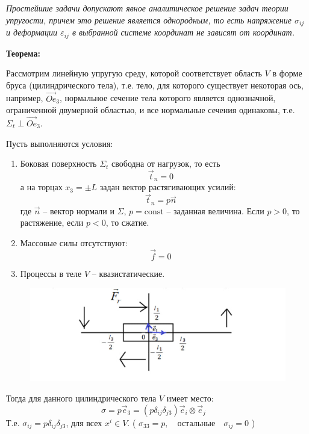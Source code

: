 

\textit{Простейшие задачи допускают явное аналитическое решение задач теории упругости, причем это решение является однородным, то есть напряжение \( \sigma_{ij} \) и деформации \( \varepsilon_{ij} \) в выбранной системе координат не зависят от координат.
}
\par
\textbf{Теорема:}

Рассмотрим линейную упругую среду, которой соответствует область \( V \) в форме бруса (цилиндрического тела), т.е. тело, для которого существует некоторая ось, например, \( \vec{Oe}_3 \), нормальное сечение тела которого является однозначной, ограниченной двумерной областью, и все нормальные сечения одинаковы, т.е. \( \Sigma_t \perp \vec{Oe}_3 \).

Пусть выполняются условия:
\begin{enumerate}
    \item Боковая поверхность \( \Sigma_t \) свободна от нагрузок, то есть
\begin{equation}
\vec{t}_n = 0 \quad \label{eq:(261)}
\end{equation}
а на торцах \( x_3 = \pm L \) задан вектор растягивающих усилий:
\begin{equation}
\vec{t}_n = p \vec{n} \quad \label{eq:(262)}
\end{equation}
где \( \vec{n} \) – вектор нормали и \( \Sigma \), \( p = \text{const} \) – заданная величина.
Если \( p > 0 \), то растяжение, если \( p < 0 \), то сжатие.
\item Массовые силы отсутствуют:
\begin{equation}
\vec{f} = 0 \quad \label{eq:(263)}
\end{equation}
\item Процессы в теле \( V \) – квазистатические.
\end{enumerate}
\begin{figure}[H]
	\centering
	\includegraphics[width=0.7\linewidth]{semester8/img/27}
	\caption{}
	\label{fig:26}
\end{figure}
Тогда для данного цилиндрического тела \( V \) имеет место:
\begin{equation}
\sigma = p \vec{e}_3 = \left( p \delta_{ij} \delta_{j3} \right) \vec{e}_i \otimes \vec{e}_j \quad \label{eq:(264)}
\end{equation}
Т.е. \( \sigma_{ij} = p \delta_{ij} \delta_{j3} \), для всех \( x^i \in V \).
(
$\sigma_{33} = p, \quad \text{остальные} \quad \sigma_{ij} = 0$
)

